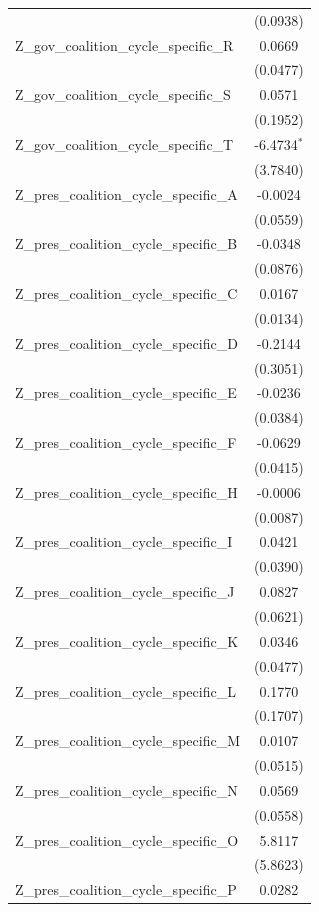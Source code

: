 \begin{tabular}{lc}
 & (0.0938) \\
Z\_gov\_coalition\_cycle\_specific\_R & 0.0669 \\
 & (0.0477) \\
Z\_gov\_coalition\_cycle\_specific\_S & 0.0571 \\
 & (0.1952) \\
Z\_gov\_coalition\_cycle\_specific\_T & -6.4734$^{*}$ \\
 & (3.7840) \\
Z\_pres\_coalition\_cycle\_specific\_A & -0.0024 \\
 & (0.0559) \\
Z\_pres\_coalition\_cycle\_specific\_B & -0.0348 \\
 & (0.0876) \\
Z\_pres\_coalition\_cycle\_specific\_C & 0.0167 \\
 & (0.0134) \\
Z\_pres\_coalition\_cycle\_specific\_D & -0.2144 \\
 & (0.3051) \\
Z\_pres\_coalition\_cycle\_specific\_E & -0.0236 \\
 & (0.0384) \\
Z\_pres\_coalition\_cycle\_specific\_F & -0.0629 \\
 & (0.0415) \\
Z\_pres\_coalition\_cycle\_specific\_H & -0.0006 \\
 & (0.0087) \\
Z\_pres\_coalition\_cycle\_specific\_I & 0.0421 \\
 & (0.0390) \\
Z\_pres\_coalition\_cycle\_specific\_J & 0.0827 \\
 & (0.0621) \\
Z\_pres\_coalition\_cycle\_specific\_K & 0.0346 \\
 & (0.0477) \\
Z\_pres\_coalition\_cycle\_specific\_L & 0.1770 \\
 & (0.1707) \\
Z\_pres\_coalition\_cycle\_specific\_M & 0.0107 \\
 & (0.0515) \\
Z\_pres\_coalition\_cycle\_specific\_N & 0.0569 \\
 & (0.0558) \\
Z\_pres\_coalition\_cycle\_specific\_O & 5.8117 \\
 & (5.8623) \\
Z\_pres\_coalition\_cycle\_specific\_P & 0.0282 \\

\end{tabular}
